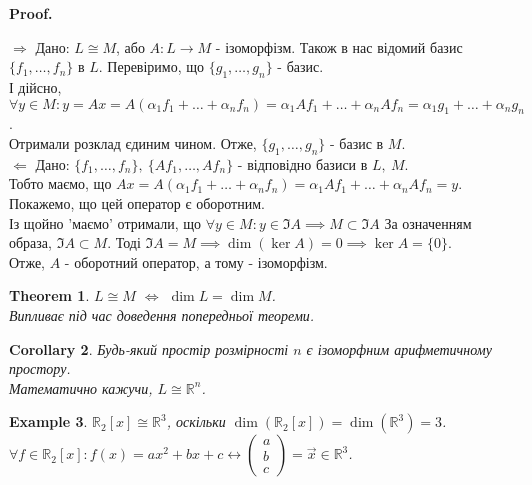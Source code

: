 \documentclass[a4paper, 10pt]{article}
\makeatletter
\def\rightproof{$\boxed{\Rightarrow}$ }
\def\leftproof{$\boxed{\Leftarrow}$ }
\theoremstyle{theoremdd}
\newtheorem{theorem}{Theorem}[subsection]
\newtheorem{example}[theorem]{Example}
\newtheorem{corollary}[theorem]{Corollary}
\renewenvironment{proof}[1][Proof.\\]{\par
\pushQED{\hfill \qed}%
\normalfont \topsep6\p@\@plus6\p@\relax
\trivlist
\item\relax
{\bfseries
#1\@addpunct{.}}\hspace\labelsep\ignorespaces
}{%
\popQED\endtrivlist\@endpefalse
}
\makeatother
\begin{document}
	\begin{proof}
	\rightproof Дано: $L \cong M$, або $A \colon L \to M$ - ізоморфізм. Також в нас відомий базис $\{f_1,\dots,f_n\}$ в $L$. Перевіримо, що $\{g_1,\dots,g_n\}$ - базис.\\
	І дійсно, $\forall y \in M: y = Ax = A(\alpha_1 f_1 + \dots + \alpha_n f_n) = \alpha_1 Af_1 + \dots + \alpha_n Af_n = \alpha_1 g_1 + \dots + \alpha_n g_n$.\\
	Отримали розклад єдиним чином. Отже, $\{g_1,\dots,g_n\}$ - базис в $M$.
	\bigskip \\
	\leftproof Дано: $\{f_1,\dots,f_n\},\ \{Af_1,\dots,Af_n\}$ - відповідно базиси в $L,\ M$.\\
	Тобто маємо, що $Ax = A(\alpha_1 f_1 + \dots + \alpha_n f_n) = \alpha_1 Af_1 + \dots + \alpha_n Af_n = y$.\\
	Покажемо, що цей оператор є оборотним.\\
Із щойно 'маємо' отримали, що $\forall y \in M: y \in \Im A \implies M \subset \Im A$ За означенням образа, $\Im A \subset M$. Тоді $\Im A = M \implies \dim(\ker A) = 0 \implies \ker A = \{0\}$.\\
	Отже, $A$ - оборотний оператор, а тому - ізоморфізм.
	\end{proof}
	
	\begin{theorem}
	$L \cong M$ $\iff$ $\dim L = \dim M$.\\
	\textit{Випливає під час доведення попередньої теореми.}
	\end{theorem}
	
	\begin{corollary}
	Будь-який простір розмірності $n$ є ізоморфним арифметичному простору.\\
	Математично кажучи, $L \cong \mathbb{R}^n$.
	\end{corollary}
	
	\begin{example}
	$\mathbb{R}_2[x] \cong \mathbb{R}^3$, оскільки $\dim(\mathbb{R}_2[x]) = \dim (\mathbb{R}^3) = 3$.\\
	$\forall f \in \mathbb{R}_2[x]: f(x) = ax^2 + bx +c \leftrightarrow \begin{pmatrix}
	a \\ b \\ c
	\end{pmatrix} = \vec{x} \in \mathbb{R}^3$.
	\end{example}
	
\end{document}
